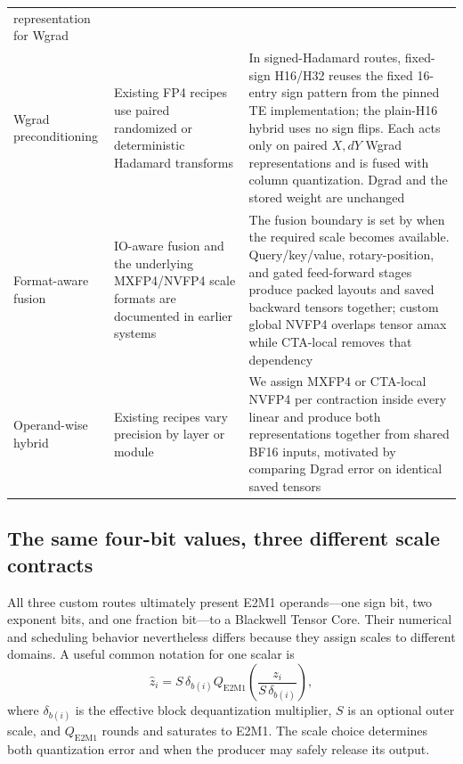 \begin{table}[tbp]
\begin{tabularx}{\textwidth}{@{}lYY@{}}
        representation for Wgrad \\
    Wgrad preconditioning
      & Existing FP4 recipes use paired randomized or deterministic Hadamard
        transforms
        \cite{tseng2025mxfp4,nvidia2025nvfp4,cim2026nativemxfp4}
      & In signed-Hadamard routes, fixed-sign H16/H32 reuses the fixed
        16-entry sign pattern from the pinned TE implementation; the plain-H16
        hybrid uses no sign flips. Each acts only on paired $X,dY$ Wgrad
        representations and is fused with column quantization. Dgrad and
        the stored weight are unchanged \\
    Format-aware fusion
      & IO-aware fusion and the underlying MXFP4/NVFP4 scale formats are
        documented in earlier systems
        \cite{ocp2023mx,nvidia2025nvfp4,dao2022flashattention,guo2026coda}
      & The fusion boundary is set by when the required scale becomes available.
        Query/key/value, rotary-position, and gated feed-forward stages produce
        packed layouts and saved backward tensors together; custom global NVFP4
        overlaps tensor amax while CTA-local removes that dependency \\
    Operand-wise hybrid
      & Existing recipes vary precision by layer or module
        \cite{zhou2025exploringfp4,nvidia2025nvfp4,
        rahimifar2026transposition}
      & We assign MXFP4 or CTA-local NVFP4 per contraction inside every linear
        and produce both representations together from shared BF16 inputs, motivated
        by comparing Dgrad error on identical saved tensors \\
    \bottomrule
  \end{tabularx}
\end{table}

\subsection{The same four-bit values, three different scale contracts}
\label{sec:scale-contracts}

All three custom routes ultimately present E2M1 operands---one sign bit, two
exponent bits, and one fraction bit---to a Blackwell Tensor Core. Their
numerical and scheduling behavior nevertheless
differs because they assign scales to different domains.  A useful common
notation for one scalar is
\begin{equation}
  \widehat z_i = S\,\delta_{b(i)}
  Q_{\mathrm{E2M1}}\!\left(\frac{z_i}{S\,\delta_{b(i)}}\right),
  \label{eq:hierarchical-quant}
\end{equation}
where $\delta_{b(i)}$ is the effective block dequantization multiplier, $S$
is an optional outer scale, and
$Q_{\mathrm{E2M1}}$ rounds and saturates to E2M1.  The scale choice determines
both quantization error and when the producer may safely release its output.

